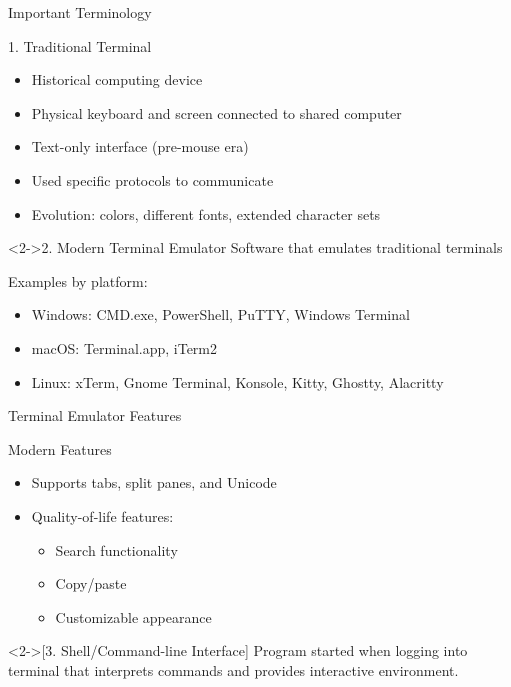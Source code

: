 \documentclass[presentation,aspectratio=1610]{beamer}
\begin{document}
\begin{frame}[label={sec:org7bceb12}]{Important Terminology}
\begin{block}{1. Traditional Terminal}
\begin{itemize}
\item Historical computing device
\item Physical keyboard and screen connected to shared computer
\item Text-only interface (pre-mouse era)
\item Used specific protocols to communicate
\item Evolution: colors, different fonts, extended character sets
\end{itemize}
\end{block}
\begin{block}<2->{2. Modern Terminal Emulator}
Software that emulates traditional terminals

\alert{Examples by platform:}
\begin{itemize}
\item \alert{Windows:} CMD.exe, PowerShell, PuTTY, Windows Terminal
\item \alert{macOS:} Terminal.app, iTerm2
\item \alert{Linux:} xTerm, Gnome Terminal, Konsole, Kitty, Ghostty, Alacritty
\end{itemize}
\end{block}
\end{frame}
\begin{frame}[label={sec:org5829016}]{Terminal Emulator Features}
\begin{exampleblock}{Modern Features}\label{sec:org93dbe07}
\begin{itemize}
\item Supports tabs, split panes, and Unicode
\item Quality-of-life features:
\begin{itemize}
\item Search functionality
\item Copy/paste
\item Customizable appearance
\end{itemize}
\end{itemize}
\end{exampleblock}
\begin{definition}<2->[3. Shell/Command-line Interface]\label{sec:org010b5b9}
Program started when logging into terminal that interprets commands and provides interactive environment.
\end{definition}
\end{frame}
\end{document}
